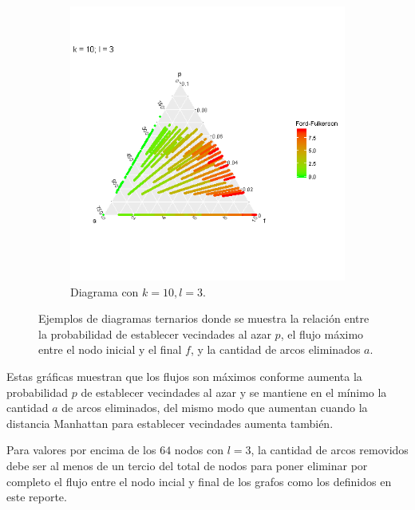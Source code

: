 \documentclass{article}
\begin{document}
\begin{figure}[h]
    \begin{subfigure}[b]{1\textwidth}
      \includegraphics[width=\textwidth]{k100l003}
      \caption{Diagrama con $k = 10, l = 3$.}
          \label{fig:d}
    \end{subfigure}
    \caption{Ejemplos de diagramas ternarios donde se muestra la relación entre la probabilidad de establecer vecindades al azar $p$, el flujo máximo entre el nodo inicial y el final $f$, y la cantidad de arcos eliminados $a$.}\label{tern}
  \end{figure}

  Estas gráficas muestran que los flujos son máximos conforme aumenta la probabilidad $p$ de establecer vecindades al azar y se mantiene en el mínimo la cantidad $a$ de arcos eliminados, del mismo modo que aumentan cuando la distancia Manhattan para establecer vecindades aumenta también.

  Para valores por encima de los $64$ nodos con $l = 3$, la cantidad de arcos removidos debe ser al menos de un tercio del total de nodos para poner eliminar por completo el flujo entre el nodo incial y final de los grafos como los definidos en este reporte.

  {}
  
\end{document}
